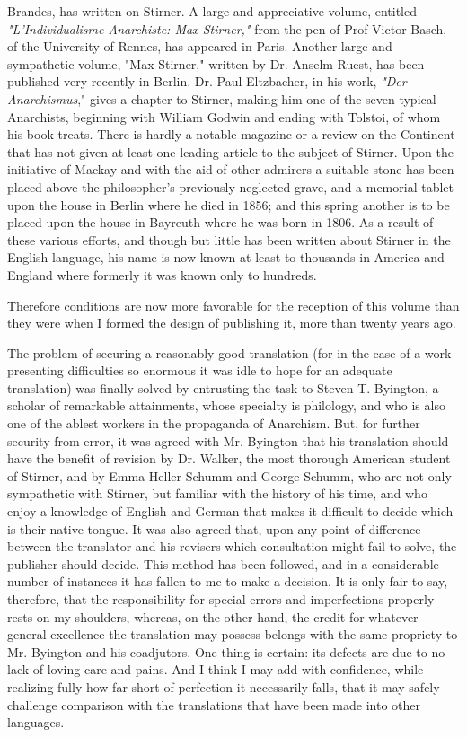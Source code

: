 \documentclass[a4paper]{book}
\begin{document}
Brandes, has written on Stirner. A large and appreciative volume, entitled 
\textit{"{}L'Individualisme Anarchiste: Max Stirner,"{}} from the pen of Prof 
Victor Basch, of the University of Rennes, has appeared in Paris. Another 
large and sympathetic volume, "{}Max Stirner,"{} written by Dr. Anselm Ruest, 
has been published very recently in Berlin. Dr. Paul Eltzbacher, in his work, 
\textit{"{}Der Anarchismus},"{} gives a chapter to Stirner, making him one of 
the seven typical Anarchists, beginning with William Godwin and ending with 
Tolstoi, of whom his book treats. There is hardly a notable magazine or a 
review on the Continent that has not given at least one leading article to the 
subject of Stirner. Upon the initiative of Mackay and with the aid of other 
admirers a suitable stone has been placed above the philosopher's previously 
neglected grave, and a memorial tablet upon the house in Berlin where he died 
in 1856; and this spring another is to be placed upon the house in Bayreuth 
where he was born in 1806. As a result of these various efforts, and though 
but little has been written about Stirner in the English language, his name is 
now known at least to thousands in America and England where formerly it was 
known only to hundreds.

Therefore conditions are now more favorable for the reception of this volume 
than they were when I formed the design of publishing it, more than twenty 
years ago.

The problem of securing a reasonably good translation (for in the case of a 
work presenting difficulties so enormous it was idle to hope for an adequate 
translation) was finally solved by entrusting the task to Steven T. Byington, 
a scholar of remarkable attainments, whose specialty is philology, and who is 
also one of the ablest workers in the propaganda of Anarchism. But, for 
further security from error, it was agreed with Mr. Byington that his 
translation should have the benefit of revision by Dr. Walker, the most 
thorough American student of Stirner, and by Emma Heller Schumm and George 
Schumm, who are not only sympathetic with Stirner, but familiar with the 
history of his time, and who enjoy a knowledge of English and German that 
makes it difficult to decide which is their native tongue. It was also agreed 
that, upon any point of difference between the translator and his revisers 
which consultation might fail to solve, the publisher should decide. This 
method has been followed, and in a considerable number of instances it has 
fallen to me to make a decision. It is only fair to say, therefore, that the 
responsibility for special errors and imperfections properly rests on my 
shoulders, whereas, on the other hand, the credit for whatever general 
excellence the translation may possess belongs with the same propriety to Mr. 
Byington and his coadjutors. One thing is certain: its defects are due to no 
lack of loving care and pains. And I think I may add with confidence, while 
realizing fully how far short of perfection it necessarily falls, that it may 
safely challenge comparison with the translations that have been made into 
other languages.
\end{document}
